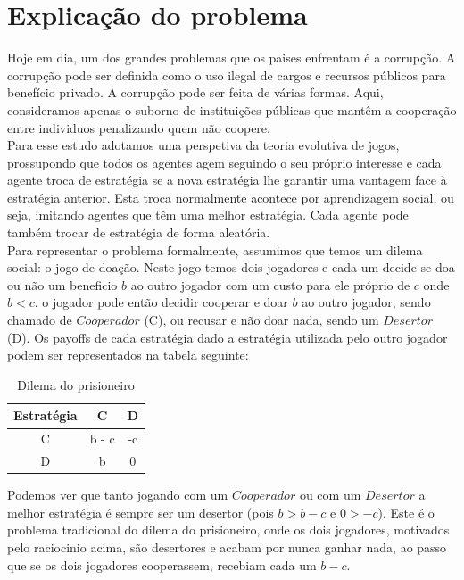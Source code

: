 \documentclass[conference, twocolumn]{IEEEtran}
\theoremstyle{plain}
\theoremstyle{definition}
\theoremstyle{remark}
\begin{document}
    \section{Explicação do problema}
    Hoje em dia, um dos grandes problemas que os paises enfrentam é a corrupção. A corrupção pode ser definida como o uso ilegal de cargos e recursos públicos para benefício privado. A corrupção pode ser feita de várias formas. Aqui, consideramos apenas o suborno de instituições públicas que mantêm a cooperação entre individuos penalizando quem não coopere. \\
    Para esse estudo adotamos uma perspetiva da teoria evolutiva de jogos, prossupondo que todos os agentes agem seguindo o seu próprio interesse e cada agente troca de estratégia se a nova estratégia lhe garantir uma vantagem face à estratégia anterior. Esta troca normalmente acontece por aprendizagem social, ou seja, imitando agentes que têm uma melhor estratégia. Cada agente pode também trocar de estratégia de forma aleatória.\\
    Para representar o problema formalmente, assumimos que temos um dilema social: o jogo de doação. Neste jogo temos dois jogadores e cada um decide se doa ou não um beneficio $b$ ao outro jogador com um custo para ele próprio de $c$ onde $b < c$. o jogador pode então decidir cooperar e doar $b$ ao outro jogador, sendo chamado de $Cooperador$ (C), ou recusar e não doar nada, sendo um $Desertor$ (D). Os payoffs de cada estratégia dado a estratégia utilizada pelo outro jogador podem ser representados na tabela seguinte:

    \begin{table}[h]
        \centering
        \begin{tabular}{c|cc}
            Estratégia & C & D \\
            \hline
            C & b - c & -c\\
            D & b & 0
        \end{tabular}
        \caption{Dilema do prisioneiro}
    \end{table}

    Podemos ver que tanto jogando com um $Cooperador$ ou com um $Desertor$ a melhor estratégia é sempre ser um desertor (pois $b > b - c$ e $0 > -c$). Este é o problema tradicional do dilema do prisioneiro, onde os dois jogadores, motivados pelo raciocinio acima, são desertores e acabam por nunca ganhar nada, ao passo que se os dois jogadores cooperassem, recebiam cada um $b - c$.
\end{document}
